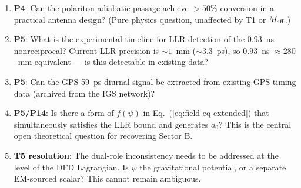 \documentclass[11pt]{article}
\newcommand{\Meff}{M_{\rm eff}}
\begin{document}
\begin{enumerate}
\item \textbf{P4}: Can the polariton adiabatic passage achieve $>50\%$
  conversion in a practical antenna design? (Pure physics question,
  unaffected by T1 or $\Meff$.)
\item \textbf{P5}: What is the experimental timeline for LLR detection of
  the 0.93~ns nonreciprocal? Current LLR precision is $\sim 1$~mm
  ($\sim 3.3$~ps), so $0.93$~ns $\approx 280$~mm equivalent ---
  is this detectable in existing data?
\item \textbf{P5}: Can the GPS 59~ps diurnal signal be extracted from
  existing GPS timing data (archived from the IGS network)?
\item \textbf{P5/P14}: Is there a form of $f(\psi)$ in Eq.~(\ref{eq:field-eq-extended})
  that simultaneously satisfies the LLR bound and generates $a_0$?
  This is the central open theoretical question for recovering Sector B.
\item \textbf{T5 resolution}: The dual-role inconsistency needs to be
  addressed at the level of the DFD Lagrangian. Is $\psi$ the gravitational
  potential, or a separate EM-sourced scalar? This cannot remain ambiguous.
\end{enumerate}
\end{document}
